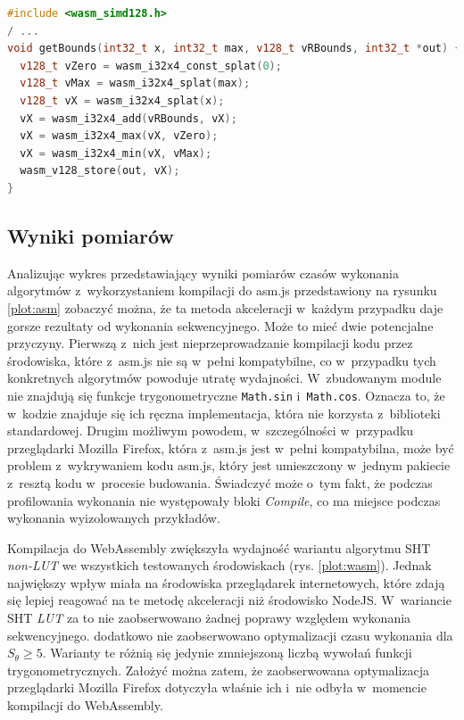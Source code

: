 \begin{lstlisting}[language=C++, float=ht, label=lst:simd, caption=Funkcja \lstinline{getBounds} algorytmu CHT z~wykorzystaniem instrukcji SIMD.]
#include <wasm_simd128.h>
/ ...
void getBounds(int32_t x, int32_t max, v128_t vRBounds, int32_t *out) {
  v128_t vZero = wasm_i32x4_const_splat(0);
  v128_t vMax = wasm_i32x4_splat(max);
  v128_t vX = wasm_i32x4_splat(x);
  vX = wasm_i32x4_add(vRBounds, vX);
  vX = wasm_i32x4_max(vX, vZero);
  vX = wasm_i32x4_min(vX, vMax);
  wasm_v128_store(out, vX);
}
\end{lstlisting}

\subsection{Wyniki pomiarów}

Analizując wykres przedstawiający wyniki pomiarów czasów wykonania algorytmów z~wykorzystaniem kompilacji do asm.js przedstawiony na rysunku \ref{plot:asm} zobaczyć można, że ta metoda akceleracji w~każdym przypadku daje gorsze rezultaty od wykonania sekwencyjnego. Może to mieć dwie potencjalne przyczyny. Pierwszą z~nich jest nieprzeprowadzanie kompilacji kodu przez środowiska, które z~asm.js nie są w~pełni kompatybilne, co w~przypadku tych konkretnych algorytmów powoduje utratę wydajności. W~zbudowanym module nie znajdują się funkcje trygonometryczne \lstinline{Math.sin} i~\lstinline{Math.cos}. Oznacza to, że w~kodzie znajduje się ich ręczna implementacja, która nie korzysta z~biblioteki standardowej. Drugim możliwym powodem, w~szczególności w~przypadku przeglądarki Mozilla Firefox, która z~asm.js jest w~pełni kompatybilna, może być problem z~wykrywaniem kodu asm.js, który jest umieszczony w~jednym pakiecie z~resztą kodu w~procesie budowania. Świadczyć może o~tym fakt, że podczas profilowania wykonania nie występowały bloki \textit{Compile}, co ma miejsce podczas wykonania wyizolowanych przykładów.







Kompilacja do WebAssembly zwiększyła wydajność wariantu algorytmu SHT \textit{non-LUT} we wszystkich testowanych środowiskach (rys. \ref{plot:wasm}). Jednak największy wpływ miała na środowiska przeglądarek internetowych, które zdają się lepiej reagować na te metodę akceleracji niż środowisko NodeJS. W~wariancie SHT \textit{LUT} za to nie zaobserwowano żadnej poprawy względem wykonania sekwencyjnego. dodatkowo nie zaobserwowano optymalizacji czasu wykonania dla $S_\theta \geq 5$. Warianty te różnią się jedynie zmniejszoną liczbą wywołań funkcji trygonometrycznych. Założyć można zatem, że zaobserwowana optymalizacja przeglądarki Mozilla Firefox dotyczyła właśnie ich i~nie odbyła w~momencie kompilacji do WebAssembly. 

